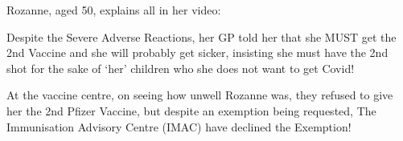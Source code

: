 Rozanne, aged 50, explains all in her video:

Despite the Severe Adverse Reactions, her GP told her that she MUST get the 2nd
Vaccine and she will probably get sicker, insisting she must have the 2nd shot
for the sake of ‘her’ children who she does not want to get Covid!

At the vaccine centre, on seeing how unwell Rozanne was, they refused to give
her the 2nd Pfizer Vaccine, but despite an exemption being requested, The
Immunisation Advisory Centre (IMAC) have declined the Exemption!
